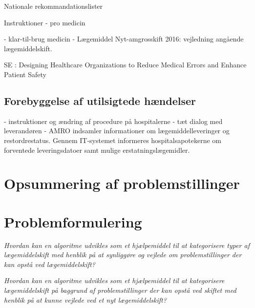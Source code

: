 Nationale rekommandationslister 

Instruktioner - pro medicin %

- klar-til-brug medicin %
- Lægemiddel Nyt-amgrosskift 2016: vejledning angående lægemiddelskift.

SE : Designing Healthcare Organizations to Reduce Medical Errors and Enhance Patient Safety

\subsection{Forebyggelse af utilsigtede hændelser}

- instruktioner og ændring af procedure på hospitalerne
- tæt dialog med leverandøren
- AMRO indsamler informationer om lægemiddelleveringer og restordrestatus. Gennem IT-systemet informeres
hospitalsapotekerne om forventede leveringsdatoer samt mulige erstatningslægemidler.


\section{Opsummering af problemstillinger}
\section{Problemformulering}
\textit{Hvordan kan en algoritme udvikles som et hjælpemiddel til at kategorisere typer af lægemiddelskift med henblik på at synliggøre og vejlede om problemstillinger der kan opstå ved lægemiddelskift?}

\textit{Hvordan kan en algoritme udvikles som et hjælpemiddel til at kategorisere lægemiddelskift på baggrund af problemstillinger der kan opstå ved skiftet med henblik på at kunne vejlede ved et nyt lægemiddelskift?} 


